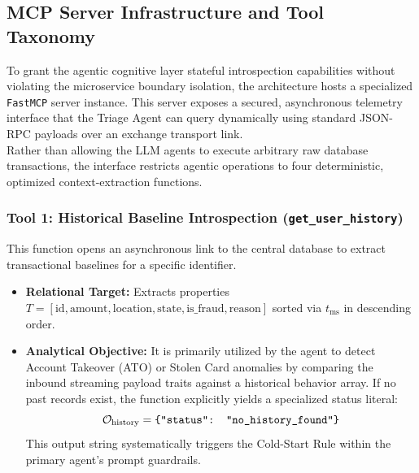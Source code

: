 \documentclass[12pt]{report}
\begin{document}
\subsection{MCP Server Infrastructure and Tool Taxonomy}
To grant the agentic cognitive layer stateful introspection capabilities without violating the microservice boundary isolation, the architecture hosts a specialized \texttt{FastMCP} server instance. This server exposes a secured, asynchronous telemetry interface that the Triage Agent can query dynamically using standard JSON-RPC payloads over an exchange transport link. 
\\
Rather than allowing the LLM agents to execute arbitrary raw database transactions, the interface restricts agentic operations to four deterministic, optimized context-extraction functions.

\subsubsection{Tool 1: Historical Baseline Introspection (\texttt{get\_user\_history})}
This function opens an asynchronous link to the central database to extract transactional baselines for a specific identifier.
\begin{itemize}
    \item \textbf{Relational Target:} Extracts properties $T = [\text{id}, \text{amount}, \text{location}, \text{state}, \text{is\_fraud}, \text{reason}]$ sorted via $t_{\text{ms}}$ in descending order.
    \item \textbf{Analytical Objective:} It is primarily utilized by the agent to detect Account Takeover (ATO) or Stolen Card anomalies by comparing the inbound streaming payload traits against a historical behavior array. If no past records exist, the function explicitly yields a specialized status literal:
    $$
        \mathcal{O}_{\text{history}} = \text{\texttt{\{"status": "no\_history\_found"\}}}
    $$
    This output string systematically triggers the Cold-Start Rule within the primary agent's prompt guardrails.
\end{itemize}
\end{document}
